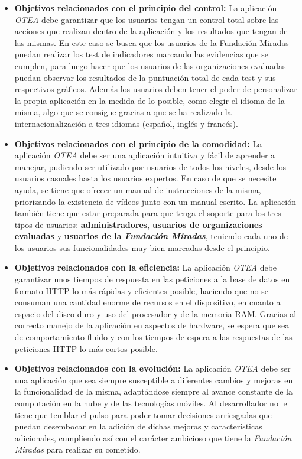 \begin{itemize}
    \item \textbf{Objetivos relacionados con el principio del control: } La
    aplicación \textit{OTEA} debe garantizar que los usuarios tengan un control
    total sobre las acciones que realizan dentro de la aplicación y los
    resultados que tengan de las mismas. En este caso se busca que los usuarios
    de la Fundación Miradas puedan realizar los test de indicadores marcando las
    evidencias que se cumplen, para luego hacer que los usuarios de las
    organizaciones evaluadas puedan observar los resultados de la puntuación
    total de cada test y sus respectivos gráficos. Además los usuarios deben
    tener el poder de personalizar la propia aplicación en la medida de lo
    posible, como elegir el idioma de la misma, algo que se consigue gracias a
    que se ha realizado la internacionalización a tres idiomas (español, inglés
    y francés).
    \item \textbf{Objetivos relacionados con el principio de la comodidad: } La
    aplicación \textit{OTEA} debe ser una aplicación intuitiva y fácil de
    aprender a manejar, pudiendo ser utilizado por usuarios de todos los
    niveles, desde los usuarios casuales hasta los usuarios expertos. En caso de
    que se necesite ayuda, se tiene que ofrecer un manual de instrucciones de la
    misma, priorizando la existencia de vídeos junto con un manual escrito. La
    aplicación también tiene que estar preparada para que tenga el soporte para
    los tres tipos de usuarios: \textbf{administradores}, \textbf{usuarios de
    organizaciones evaluadas} y \textbf{usuarios de la \textit{Fundación
    Miradas}}, teniendo cada uno de los usuarios sus funcionalidades muy bien
    marcadas desde el principio.
    \item \textbf{Objetivos relacionados con la eficiencia: } La aplicación
    \textit{OTEA} debe garantizar unos tiempos de respuesta en las peticiones a
    la base de datos en formato HTTP lo más rápidas y eficientes posible,
    haciendo que no se consuman una cantidad enorme de recursos en el
    dispositivo, en cuanto a espacio del disco duro y uso del procesador y de la
    memoria RAM. Gracias al correcto manejo de la aplicación en aspectos de
    hardware, se espera que sea de comportamiento fluido y con los tiempos de
    espera a las respuestas de las peticiones HTTP lo más cortos posible.
    \item \textbf{Objetivos relacionados con la evolución: } La aplicación
    \textit{OTEA} debe ser una aplicación que sea siempre susceptible a
    diferentes cambios y mejoras en la funcionalidad de la misma, adaptándose
    siempre al avance constante de la computación en la nube y de las
    tecnologías móviles. Al desarrollador no le tiene que temblar el pulso para
    poder tomar decisiones arriesgadas que puedan desembocar en la adición de
    dichas mejoras y características adicionales, cumpliendo así con el carácter
    ambicioso que tiene la \textit{Fundación Miradas} para realizar su cometido. 
\end{itemize}


